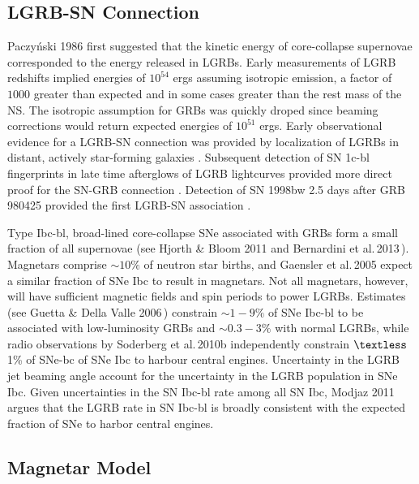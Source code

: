 \documentclass{article}
\begin{document}
\subsection{LGRB-SN Connection}

Paczy\'nski 1986 \cite{Pac:1986ap} first suggested that the kinetic energy of core-collapse supernovae corresponded to the energy released in LGRBs. Early measurements of LGRB redshifts implied energies of $10^{54}$ ergs assuming isotropic emission, a factor of $1000$ greater than expected and in some cases greater than the rest mass of the NS. The isotropic assumption for GRBs was quickly droped since beaming corrections would return expected energies of $10^{51}$ ergs. Early observational evidence for a LGRB-SN connection was provided by localization of LGRBs in distant, actively star-forming galaxies \cite{Woosley:2006fn}\cite{Djorgo:2001}. Subsequent detection of SN 1c-bl fingerprints in late time afterglows of LGRB lightcurves provided more direct proof for the SN-GRB connection \cite{Modjaz:2011}. Detection of SN 1998bw 2.5 days after GRB 980425 provided the first LGRB-SN association \cite{Pian:1999ec}.

Type Ibc-bl, broad-lined core-collapse SNe associated with GRBs form a small fraction of all supernovae (see Hjorth \& Bloom 2011 \cite{Hjorth:2012} and Bernardini et al.\,2013\,\cite{Bernardini:2013nfa}). Magnetars comprise $\sim 10\%$ of neutron star births, and Gaensler et al.\,2005 \cite{Gaensler:2005qk} expect a similar fraction of SNe Ibc to result in magnetars. Not all magnetars, however, will have sufficient magnetic fields and spin periods to power LGRBs. Estimates (see Guetta \& Della Valle 2006\,\cite{Guetta:2006gq}) constrain $\sim 1-9\%$ of SNe Ibc-bl to be associated with low-luminosity GRBs and $\sim 0.3-3\%$ with normal LGRBs, while radio observations by Soderberg et al.\,2010b \cite{Sodnat:2010} independently constrain $\textless$ 1\% of SNe-bc  of SNe Ibc to harbour central engines. Uncertainty in the LGRB jet beaming angle account for the uncertainty in the LGRB population in SNe Ibc. Given uncertainties in the SN Ibc-bl rate among all SN Ibc, Modjaz 2011\,\cite{Modjaz:2011} argues that the LGRB rate in SN Ibc-bl is broadly consistent with the expected fraction of SNe to harbor central engines.

\subsection{Magnetar Model}
\end{document}
